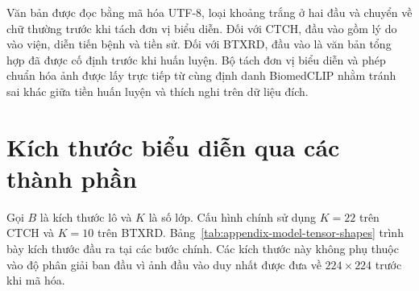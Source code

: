 Văn bản được đọc bằng mã hóa UTF-8, loại khoảng trắng ở hai đầu và chuyển về chữ thường trước khi tách đơn vị biểu diễn. Đối với CTCH, đầu vào gồm lý do vào viện, diễn tiến bệnh và tiền sử. Đối với BTXRD, đầu vào là văn bản tổng hợp đã được cố định trước khi huấn luyện. Bộ tách đơn vị biểu diễn và phép chuẩn hóa ảnh được lấy trực tiếp từ cùng định danh BiomedCLIP nhằm tránh sai khác giữa tiền huấn luyện và thích nghi trên dữ liệu đích.

\section{Kích thước biểu diễn qua các thành phần}

Gọi $B$ là kích thước lô và $K$ là số lớp. Cấu hình chính sử dụng $K=22$ trên CTCH và $K=10$ trên BTXRD. Bảng~\ref{tab:appendix-model-tensor-shapes} trình bày kích thước đầu ra tại các bước chính. Các kích thước này không phụ thuộc vào độ phân giải ban đầu vì ảnh đầu vào duy nhất được đưa về $224\times224$ trước khi mã hóa.

\begin{table}[H]
\centering
\small
{}
\caption{Kích thước các biểu diễn tại những bước chính của XBone-Net}
\label{tab:appendix-model-tensor-shapes}
\end{table}

